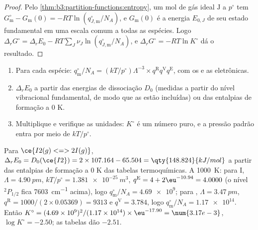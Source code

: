 \begin{proof}
Pelo \cref{thm:b3:partition-functions:entropy}, um mol de gás ideal $\mathrm J$ a $p^\circ$ tem
$G^\circ_{\mathrm m} - G_{\mathrm m}(0) = -RT\ln(q^\circ_{J,\mathrm m}/N_A)$, e $G_{\mathrm m}(0)$ é a energia $E_{0,J}$
de seu estado fundamental em uma escala comum a todas as espécies. Logo $\Delta_rG^\circ =
\Delta_rE_0 - RT\sum_J\nu_J\ln(q^\circ_{J,\mathrm m}/N_A)$, e $\Delta_rG^\circ = -RT\ln K^\circ$ dá o
resultado.
\end{proof}

\begin{method}\label{met:b3:statistical-thermo-applied:k-stat}
\begin{enumerate}
  \item Para cada espécie: $q^\circ_{\mathrm m}/N_A = (kT/p^\circ)\Lambda^{-3}\times q^{\mathrm R}q^{\mathrm V}q^{\mathrm E}$, com os
         e as  eletrônicas.
  \item $\Delta_rE_0$ a partir das energias de dissociação $D_0$ (medidas a partir do
        nível vibracional fundamental, de modo que as  estão
        incluídas) ou das entalpias de formação a 0 K.
  \item Multiplique e verifique as unidades: $K^\circ$ é um número puro, e a pressão
        padrão entra por meio de $kT/p^\circ$.
\end{enumerate}
\end{method}

\begin{example}\label{ex:b3:statistical-thermo-applied:iodine}
Para $\ce{I2(g) <=> 2 I(g)}$, $\Delta_rE_0 = D_0(\ce{I2}) = 2 \times 107.164 - 65.504 = \qty{148.824}{kJ/mol}$
a partir das entalpias de formação a 0 K das tabelas termoquímicas. A
\qty{1000}{K}: para I, $\Lambda = \qty{4.90}{pm}$, $kT/p^\circ = \qty{1.381e-25}{m^3}$, $q^{\mathrm E} = 4 +
2\eu^{-10.94} = 4.0000$ (o nível ${}^2P_{1/2}$ fica \qty{7603}{cm^{-1}} acima), logo $q^\circ_{\mathrm m}/N_A = \num{4.69e9}$;
para , $\Lambda = \qty{3.47}{pm}$, $q^{\mathrm R} = 1000/(2 \times 0.05369) = 9313$ e $q^{\mathrm V} = 3.784$, logo
$q^\circ_{\mathrm m}/N_A = \num{1.17e14}$. Então $K^\circ = (4.69\times10^9)^2/(1.17\times10^{14}) \times \eu^{-17.90} =
\num{3.17e-3}$, $\log K^\circ = -2.50$; as tabelas dão $-2.51$.
\end{example}

